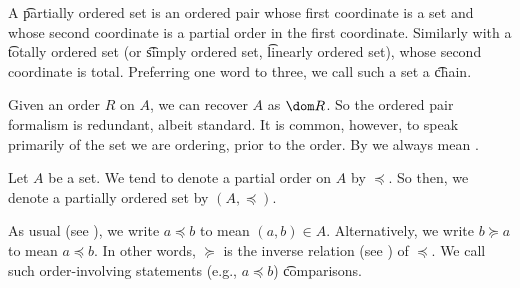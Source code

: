 
A \t{partially ordered set} is an ordered pair whose first coordinate is a set and whose second coordinate is a partial order in the first coordinate.
Similarly with a \t{totally ordered set} (or \t{simply ordered set}, \t{linearly ordered set}), whose second coordinate is total.
Preferring one word to three, we call such a set a \t{chain}.

Given an order $R$ on $A$, we can recover $A$ as $\dom R$.
So the ordered pair formalism is redundant, albeit standard.
It is common, however, to speak primarily of the set we are ordering, prior to the order.
By  we always mean .



Let $A$ be a set.
We tend to denote a partial order on $A$ by $\preceq$.
So then, we denote a partially ordered set by $(A, \preceq)$.

As usual (see ), we write $a \preceq b$ to mean $(a, b) \in A$.
Alternatively, we write $b \succeq a$ to mean $a \preceq b$.
In other words, $\succeq$ is the inverse relation (see ) of $\preceq$.
We call such order-involving statements (e.g., $a \preceq b$) \t{comparisons}.


%

